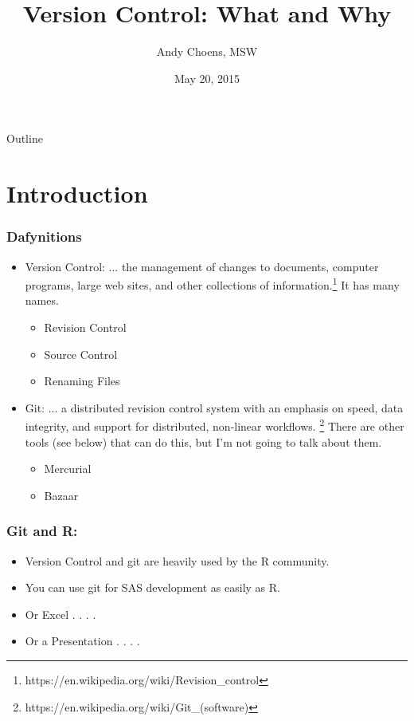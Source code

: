 \documentclass{beamer}
\title[Version Control Intro]{Version Control: What and Why}
\author{Andy Choens, MSW}
\institute{Office of Quality and Patient Safety}
\date{May 20, 2015}
\begin{document}
\begin{frame} %
  \titlepage
\end{frame}

\begin{frame}{Outline} %
  \tableofcontents
\end{frame}

\section{Introduction} %

\begin{frame} %
  \frametitle{Dafynitions}
  \begin{itemize}
  \item Version Control: ... the management of changes to documents,
    computer programs, large web sites, and other collections of
    information.\footnote{https://en.wikipedia.org/wiki/Revision\_control}
    It has many names.
    \begin{itemize}
    \item Revision Control
    \item Source Control
    \item Renaming Files
    \end{itemize}
  \item Git: ... a distributed revision control system with an
    emphasis on speed, data integrity, and support for distributed,
    non-linear
    workflows. \footnote{https://en.wikipedia.org/wiki/Git\_(software)}
    There are other tools (see below) that can do this, but I'm not going to
    talk about them.
    \begin{itemize}
    \item Mercurial
    \item Bazaar
    \end{itemize}

  \end{itemize}
\end{frame}  

\begin{frame} %
  \frametitle{Git and R:}  
  \begin{itemize}
  \item Version Control and git are heavily used by the R community.
  \item You can use git for SAS development as easily as R.
  \item Or Excel . . . . 
  \item Or a Presentation . . . .
  \end{itemize}
\end{frame}
\end{document}
